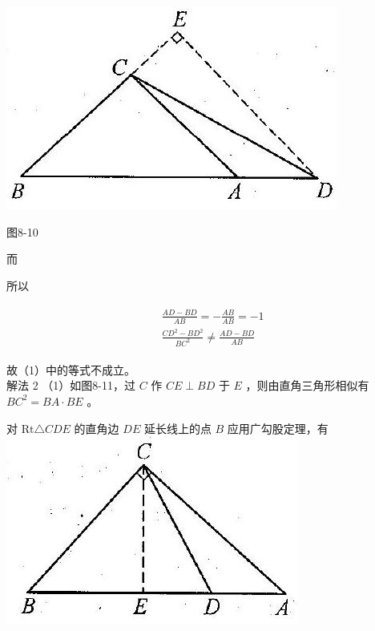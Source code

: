 \documentclass[10pt]{article}
\begin{document}
\begin{center}
\includegraphics[max width=\textwidth]{2024_10_30_2c8f45efd4a519b08e1ag-087(1)}
\end{center}

图8-10

而

所以

\begin{align*}
\begin{aligned}
& \frac{A D-B D}{A B}=-\frac{A B}{A B}=-1 \\
& \frac{C D^{2}-B D^{2}}{B C^{2}} \neq \frac{A D-B D}{A B}
\end{aligned}
\end{align*}

故（1）中的等式不成立。\\
解法 2 （1）如图8-11，过 $C$ 作 $C E \perp B D$ 于 $E$ ，则由直角三角形相似有 $B C^{2}=B A \cdot B E$ 。

对 $\mathrm{Rt} \triangle C D E$ 的直角边 $D E$ 延长线上的点 $B$ 应用广勾股定理，有\\
\includegraphics[max width=\textwidth, center]{2024_10_30_2c8f45efd4a519b08e1ag-087}
\end{document}

